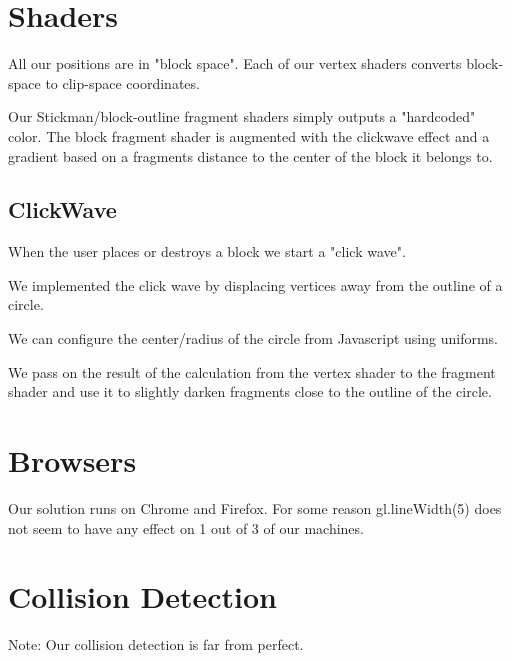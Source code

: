 \documentclass[12pt,leqno]{article}
\begin{document}
\section{Shaders}
All our positions are in "block space". Each of our vertex shaders converts block-space to clip-space coordinates.

Our Stickman/block-outline fragment shaders simply outputs a "hardcoded" color. The block fragment shader is augmented with the clickwave effect and a gradient based on a fragments distance to the center of the block it belongs to.

\subsection{ClickWave}
When the user places or destroys a block we start a "click wave". 

We implemented the click wave by displacing vertices away from the outline of a circle.

We can configure the center/radius of the circle from Javascript using uniforms.

We pass on the result of the calculation from the vertex shader to the fragment shader and use it to slightly darken fragments close to the outline of the circle.

\section{Browsers}

Our solution runs on Chrome and Firefox. For some reason gl.lineWidth(5) does not seem to have any effect on 1 out of 3 of our machines.

\section{Collision Detection}

Note: Our collision detection is far from perfect. 

\end{document}
